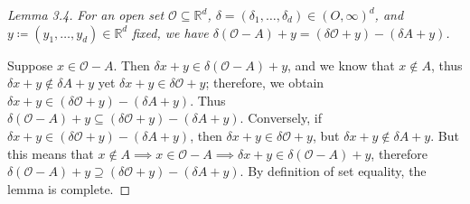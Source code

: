 \begin{proof}[Lemma 3.4]
	\emph{For an open set \( \mathcal{O}  \subseteq \mathbb{R}^{d} \), \( \delta = (\delta_1, \hdots , \delta_d) \in (O, \infty)^{d}  \), and \( y \coloneqq (y_1, \hdots , y_d) \in \mathbb{R}^{d}  \) fixed, we have \(\delta(\mathcal{O} - A) + y = (\delta \mathcal{O} + y) - (\delta A + y)\).}
	
	Suppose \( x \in \mathcal{O} - A \). Then \( \delta x + y \in \delta(\mathcal{O} - A) + y   \), and we know that \( x \notin A \), thus \( \delta x + y \notin \delta A + y \) yet \( \delta x + y \in \delta \mathcal{O} + y \); therefore, we obtain \( \delta x + y \in (\delta \mathcal{O} + y) - (\delta A + y)\). Thus \( \delta (\mathcal{O} - A) + y \subseteq (\delta \mathcal{O} + y)  - (\delta A + y). \) Conversely, if \( \delta x + y \in (\delta \mathcal{O} + y)  - (\delta A + y) \), then \( \delta x + y \in \delta \mathcal{O} + y\), but \( \delta x + y \notin \delta A + y \). But this means that \( x \notin A \implies x \in \mathcal{O} - A \implies \delta x + y \in \delta (\mathcal{O} -A) + y	\), therefore  \( \delta (\mathcal{O} - A) + y \supseteq (\delta \mathcal{O} + y) - (\delta A + y). \) By definition of set equality, the lemma is complete.
\end{proof}

